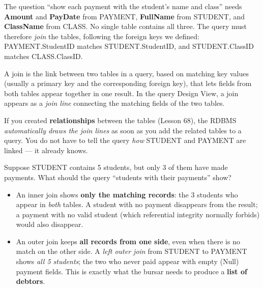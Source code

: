 \documentclass[11pt]{article}
\newcommand{\cle}[1]{{\popxbold\color{popdark}#1}}
\newcounter{popsec}
\newcounter{popsub}
\newcommand{\courssub}[1]{%
  \stepcounter{popsub}%
  \par\vspace{9pt}\noindent{\popxbold\fontsize{11.5}{13}\selectfont\color{popink}{\color{poporange}\thepopsec.\thepopsub}\hspace{6pt}#1}\par\nopagebreak\vspace{4pt}
}
\begin{document}
The question ``show each payment with the student's name and class'' needs \textbf{Amount} and \textbf{PayDate} from PAYMENT, \textbf{FullName} from STUDENT, and \textbf{ClassName} from CLASS. No single table contains all three. The query must therefore \emph{join} the tables, following the foreign keys we defined: PAYMENT.StudentID matches STUDENT.StudentID, and STUDENT.ClassID matches CLASS.ClassID.

\begin{definition}[Join]
A \cle{join} is the link between two tables in a query, based on matching key values (usually a primary key and the corresponding foreign key), that lets fields from both tables appear together in one result. In the query Design View, a join appears as a \emph{join line} connecting the matching fields of the two tables.
\end{definition}

\begin{aretenir}
If you created \textbf{relationships} between the tables (Lesson 68), the RDBMS \emph{automatically draws the join lines} as soon as you add the related tables to a query. You do not have to tell the query \emph{how} STUDENT and PAYMENT are linked --- it already knows.
\end{aretenir}

\courssub{Inner Joins and Outer Joins}

Suppose STUDENT contains 5 students, but only 3 of them have made payments. What should the query ``students with their payments'' show?

\begin{itemize}
\item An \cle{inner join} shows \textbf{only the matching records}: the 3 students who appear in \emph{both} tables. A student with no payment disappears from the result; a payment with no valid student (which referential integrity normally forbids) would also disappear.
\item An \cle{outer join} keeps \textbf{all records from one side}, even when there is no match on the other side. A \emph{left outer join} from STUDENT to PAYMENT shows \emph{all 5 students}; the two who never paid appear with empty (Null) payment fields. This is exactly what the bursar needs to produce a \textbf{list of debtors}.
\end{itemize}
\end{document}
